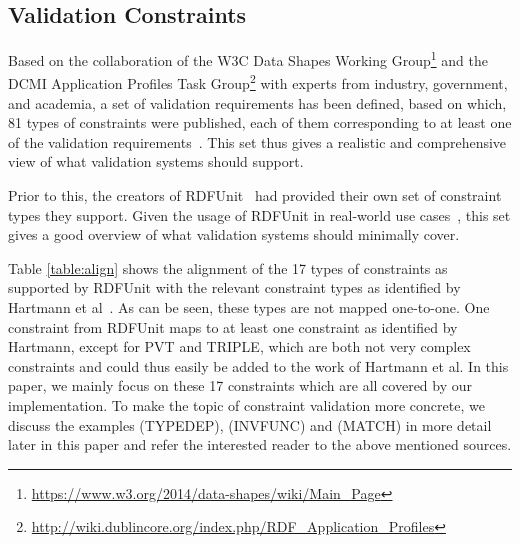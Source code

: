 \subsection{\rdf Validation Constraints}\label{cons}


Based on the collaboration of
the W3C \rdf Data Shapes Working Group\footnote{\url{https://www.w3.org/2014/data-shapes/wiki/Main_Page}} and
the DCMI \rdf Application Profiles Task Group\footnote{\url{http://wiki.dublincore.org/index.php/RDF_Application_Profiles}}
with experts from industry, government, and academia,
a set of validation requirements has been defined,
based on which,
81 types of constraints were published,
each of them corresponding to at least one of the validation requirements~\cite{bosch2015rdf}.
This set thus gives a realistic and comprehensive view of what validation systems should support. 


Prior to this, the creators of RDFUnit~\cite{kontokostas2014test} had provided their own set of constraint types they support.
Given the usage of RDFUnit in real-world use cases~\cite{jurion_rdfunit},
this set gives a good overview
of what validation systems should minimally cover.


Table \ref{table:align} shows
the alignment of the 17 types of constraints as supported by RDFUnit
with the relevant constraint types as identified by Hartmann et al~\cite{bosch2015}. 
\sloppy
As can be seen, these types are not mapped one-to-one. 
One constraint from RDFUnit maps to
at least one constraint as identified by Hartmann, 
except for PVT and TRIPLE, which are both not very complex constraints and could thus easily be added to the work of Hartmann et al. 
In this paper, we mainly focus on these 17 constraints which are all covered by our implementation.
To make the topic of constraint validation more concrete, we discuss the examples (TYPEDEP), (INVFUNC) and (MATCH) in more detail  later in this paper 
and refer the interested reader to the above mentioned sources. 

